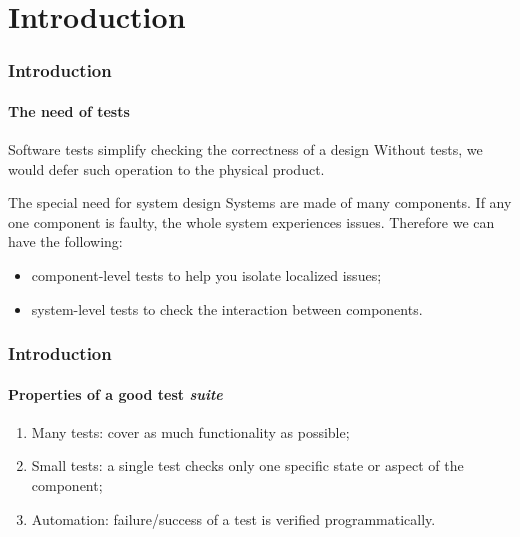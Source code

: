 \section{Introduction}

\begin{frame}
\frametitle{Introduction}
\framesubtitle{The need of tests}

\begin{block}{Software tests simplify checking the correctness of a design}
Without tests, we would defer such operation to the physical product.
\end{block}
\pause
\begin{block}{The special need for system design}
Systems are made of many components. If any one component is faulty, the whole system experiences issues. 
Therefore we can have the following:
\begin{itemize}
\item component-level tests to help you isolate localized issues;
\item system-level tests to check the interaction between components.
\end{itemize}
\end{block}
\end{frame}

\begin{frame}
\frametitle{Introduction}
\framesubtitle{Properties of a good test {\em suite}}

\begin{enumerate}
\item Many tests: cover as much functionality as possible;
\pause
\item Small tests: a single test checks only one specific state or aspect of the component;
\pause
\item Automation: failure/success of a test is verified programmatically.
\end{enumerate}

\end{frame}


